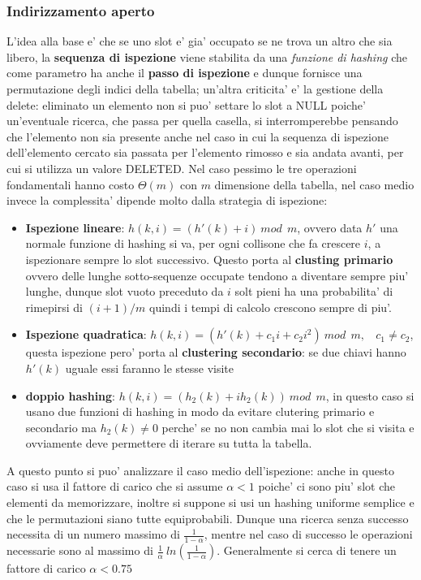 \documentclass{article}
\begin{document}
\subsubsection{Indirizzamento aperto}
L'idea alla base e' che se uno slot e' gia' occupato se ne trova un altro che sia libero, la \textbf{sequenza di ispezione} viene stabilita da una \textit{funzione di hashing} che come parametro ha anche il \textbf{passo di ispezione} e dunque fornisce una permutazione degli indici della tabella; 
un'altra criticita' e' la gestione della delete: eliminato un elemento non si puo' settare lo slot a NULL poiche' un'eventuale ricerca, che passa per quella casella, si interromperebbe pensando che l'elemento non sia presente anche nel caso in cui la sequenza di ispezione dell'elemento cercato sia passata per l'elemento rimosso e sia andata avanti, per cui si utilizza un valore DELETED. 
Nel caso pessimo le tre operazioni fondamentali hanno costo $\Theta(m)$ con $m$ dimensione della tabella, nel caso medio invece la complessita' dipende molto dalla strategia di ispezione:
\begin{itemize}
    \item \textbf{Ispezione lineare}: $h(k,i)=(h'(k)+i)\ mod \ \ m$, ovvero data $h'$ una normale funzione di hashing si va, per ogni collisone che fa crescere $i$, a ispezionare sempre lo slot successivo.
    Questo porta al \textbf{clusting primario} ovvero delle lunghe sotto-sequenze occupate tendono a diventare sempre piu' lunghe, dunque slot vuoto preceduto da $i$ solt pieni ha una probabilita' di rimepirsi di $(i +1)/m$ quindi i tempi di calcolo crescono sempre di piu'.
    \item \textbf{Ispezione quadratica}: $h(k,i)=(h'(k)+c_1i+c_2i^2)\ mod \ \ m, \ \ \ \ c_1  \not=c_2$, questa ispezione pero' porta al \textbf{clustering secondario}: se due chiavi hanno $h'(k)$ uguale essi faranno le stesse visite
    \item \textbf{doppio hashing}: $h(k,i)=(h_2(k)+ih_2(k))\ mod \ \ m$, in questo caso si usano due funzioni di hashing in modo da evitare clutering primario e secondario ma $h_2(k) \not=0$ perche' se no non cambia mai lo slot che si visita e ovviamente deve permettere di iterare su tutta la tabella.
    
\end{itemize}

A questo punto si puo' analizzare il caso medio dell'ispezione: anche in questo caso si usa il fattore di carico che si assume $\alpha<1$ poiche' ci sono piu' slot che elementi da memorizzare, inoltre si suppone si usi un hashing uniforme semplice e che le permutazioni siano tutte equiprobabili. Dunque una ricerca senza successo necessita di un numero massimo di $\frac{1}{1-\alpha} $, mentre nel caso di successo le operazioni necessarie sono al massimo di $\frac{1}{\alpha}\  ln(\frac{1}{1-\alpha})$. Generalmente si cerca di tenere un fattore di carico $\alpha <0.75$
\end{document}
